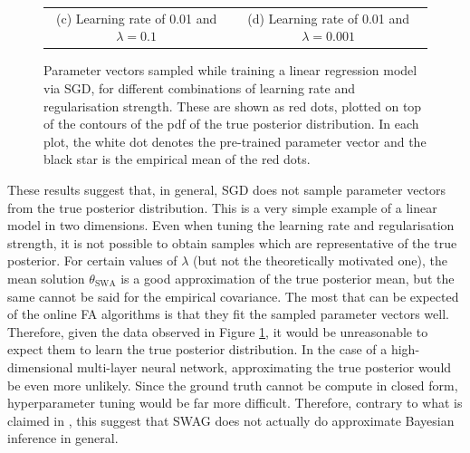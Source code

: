 \documentclass[msc,deptreport.inf]{infthesis} %
\begin{document}
\begin{figure}[!htbp]
\begin{tabular}{cc}
		 (c) Learning rate of 0.01 and $\lambda = 0.1$
		 & (d) Learning rate of 0.01 and $\lambda = 0.001$ \\[6pt]
	\end{tabular}
	\caption{Parameter vectors sampled while training a linear regression model via SGD, for different combinations of learning rate and regularisation strength. These are shown as red dots, plotted on top of the contours of the pdf of the true posterior distribution. In each plot, the white dot denotes the pre-trained parameter vector and the black star is the empirical mean of the red dots.}
	\label{fig:linear_regression_pdfs}
\end{figure}

These results suggest that, in general, SGD does not sample parameter vectors from the true posterior distribution. This is a very simple example of a linear model in two dimensions. Even when tuning the learning rate and regularisation strength, it is not possible to obtain samples which are representative of the true posterior. For certain values of $\lambda$ (but not the theoretically motivated one), the mean solution $\theta_{\text{SWA}}$ is a good approximation of the true posterior mean, but the same cannot be said for the empirical covariance. The most that can be expected of the online FA algorithms is that they fit the sampled parameter vectors well. Therefore, given the data observed in Figure \ref{fig:linear_regression_pdfs}, it would be unreasonable to expect them to learn the true posterior distribution. In the case of a high-dimensional multi-layer neural network, approximating the true posterior would be even more unlikely. Since the ground truth cannot be compute in closed form, hyperparameter tuning would be far more difficult. Therefore, contrary to what is claimed in \cite{maddox2019}, this suggest that SWAG does not actually do approximate Bayesian inference in general.
\end{document}
